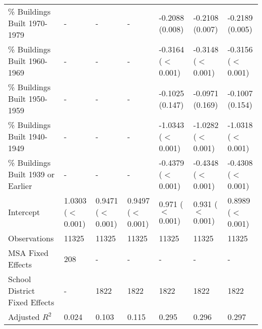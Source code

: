 \begin{landscape}
\begin{table}[h]
\begin{tabular}{l|llllll}
\% Buildings Built 1970-1979 &- & - & - & -0.2088 (0.008) & -0.2108 (0.007) & -0.2189 (0.005) \\
\% Buildings Built 1960-1969 &- & - & - & -0.3164 ($<$0.001) & -0.3148 ($<$0.001) & -0.3156 ($<$0.001) \\
\% Buildings Built 1950-1959 &- & - & - & -0.1025 (0.147) & -0.0971 (0.169) & -0.1007 (0.154) \\
\% Buildings Built 1940-1949 &- & - & - & -1.0343 ($<$0.001) & -1.0282 ($<$0.001) & -1.0318 ($<$0.001) \\
\% Buildings Built 1939 or Earlier &- & - & - & -0.4379 ($<$0.001) & -0.4348 ($<$0.001) & -0.4308 ($<$0.001) \\
Intercept &1.0303 ($<$0.001) & 0.9471 ($<$0.001) & 0.9497 ($<$0.001) & 0.971 ($<$0.001) & 0.931 ($<$0.001) & 0.8989 ($<$0.001) \\
Observations &11325 & 11325 & 11325 & 11325 & 11325 & 11325 \\
MSA Fixed Effects &208 & - & - & - & - & - \\
School District Fixed Effects &- & 1822 & 1822 & 1822 & 1822 & 1822 \\
Adjusted $R^2$ &0.024 & 0.103 & 0.115 & 0.295 & 0.296 & 0.297 \\\hline
\end{tabular}
\end{table}
\newpage
\end{landscape}
\restoregeometry
